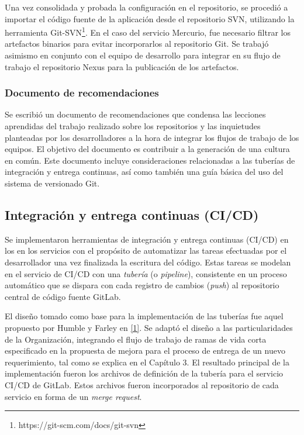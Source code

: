 Una vez consolidada y probada la configuración en el repositorio, se procedió a importar el código fuente de la aplicación desde el repositorio SVN, utilizando la herramienta Git-SVN\footnote{ https://git-scm.com/docs/git-svn}. En el caso del servicio Mercurio, fue necesario filtrar los artefactos binarios para evitar incorporarlos al repositorio Git. Se trabajó asimismo en conjunto con el equipo de desarrollo para integrar en su flujo de trabajo el repositorio Nexus para la publicación de los artefactos.

\subsubsection{Documento de recomendaciones}

Se escribió un documento de recomendaciones que condensa las lecciones aprendidas del trabajo realizado sobre los repositorios y las inquietudes planteadas por los desarrolladores a la hora de integrar los flujos de trabajo de los equipos. El objetivo del documento es contribuir a la generación de una cultura en común. Este documento incluye consideraciones relacionadas a las tuberías de integración y entrega continuas, así como también una guía básica del uso del sistema de versionado Git.

\subsection{Integración y entrega continuas (CI/CD)}

Se implementaron herramientas de integración y entrega continuas (CI/CD) en los en los servicios con el propósito de automatizar las tareas efectuadas por el desarrollador una vez finalizada la escritura del código. Estas tareas se modelan en el servicio de CI/CD con una \textit{tubería} (o \textit{pipeline}), consistente en un proceso automático que se dispara con cada  registro de cambios (\textit{push}) al repositorio central de código fuente GitLab.

El diseño tomado como base para la implementación de las tuberías fue aquel propuesto por Humble y Farley en \href{https://www.zotero.org/google-docs/?9SSytI}{[1]}. Se adaptó el diseño a las particularidades de la Organización, integrando el flujo de trabajo de ramas de vida corta especificado en la propuesta de mejora para el proceso de entrega de un nuevo requerimiento, tal como se explica en el Capítulo 3. El resultado principal de la implementación fueron los archivos de definición de la tubería para el servicio CI/CD de GitLab. Estos archivos fueron incorporados al repositorio de cada servicio en forma de un \textit{merge request}.

